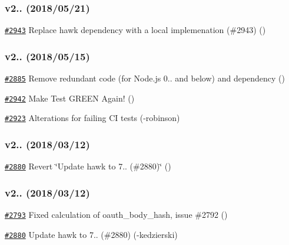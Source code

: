 \subsubsection*{v2.. (2018/05/21)}


\begin{DoxyItemize}
\item \href{https://github.com/request/request/pull/2943}{\tt \#2943} Replace hawk dependency with a local implemenation (\#2943) ()
\end{DoxyItemize}

\subsubsection*{v2.. (2018/05/15)}


\begin{DoxyItemize}
\item \href{https://github.com/request/request/pull/2885}{\tt \#2885} Remove redundant code (for Node.\+js 0.. and below) and dependency ()
\item \href{https://github.com/request/request/pull/2942}{\tt \#2942} Make Test G\+R\+E\+EN Again! ()
\item \href{https://github.com/request/request/pull/2923}{\tt \#2923} Alterations for failing CI tests (-\/robinson)
\end{DoxyItemize}

\subsubsection*{v2.. (2018/03/12)}


\begin{DoxyItemize}
\item \href{https://github.com/request/request/pull/2880}{\tt \#2880} Revert \char`\"{}\+Update hawk to 7.. (\#2880)\char`\"{} ()
\end{DoxyItemize}

\subsubsection*{v2.. (2018/03/12)}


\begin{DoxyItemize}
\item \href{https://github.com/request/request/pull/2793}{\tt \#2793} Fixed calculation of oauth\+\_\+body\+\_\+hash, issue \#2792 ()
\item \href{https://github.com/request/request/pull/2880}{\tt \#2880} Update hawk to 7.. (\#2880) (-\/kedzierski)
\end{DoxyItemize}

